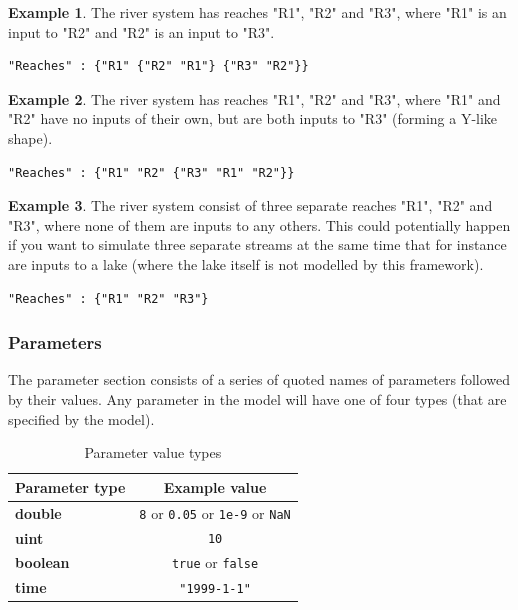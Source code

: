 \documentclass[11pt]{article}
\theoremstyle{definition}
\newtheorem{myexample}{Example}
\newenvironment{example}%
  {\begin{lrbox}{\examplebox}%
   \begin{minipage}{\dimexpr\linewidth-2\fboxsep}
   \begin{myexample}}%
  {\end{myexample}%
   \end{minipage}%
   \end{lrbox}%
   \begin{trivlist}
     \item[]\colorbox{silver}{\usebox\examplebox}
   \end{trivlist}}
\begin{document}
\begin{example}
The river system has reaches "R1", "R2" and "R3", where "R1" is an input to "R2" and "R2" is an input to "R3".
\begin{lstlisting}
"Reaches" : {"R1" {"R2" "R1"} {"R3" "R2"}}
\end{lstlisting} 
\end{example}

\begin{example}
The river system has reaches "R1", "R2" and "R3", where "R1" and "R2" have no inputs of their own, but are both inputs to "R3" (forming a Y-like shape).
\begin{lstlisting}
"Reaches" : {"R1" "R2" {"R3" "R1" "R2"}}
\end{lstlisting} 
\end{example}

\begin{example}
The river system consist of three separate reaches "R1", "R2" and "R3", where none of them are inputs to any others. This could potentially happen if you want to simulate three separate streams at the same time that for instance are inputs to a lake (where the lake itself is not modelled by this framework).
\begin{lstlisting}
"Reaches" : {"R1" "R2" "R3"}
\end{lstlisting} 
\end{example}

\subsubsection{Parameters}

The parameter section consists of a series of quoted names of parameters followed by their values. Any parameter in the model will have one of four types (that are specified by the model). 

\begin{table}[H]
\centering
\label{tab:parametervalues}
\begin{tabular}{|l|c|}
\hline
{\bf Parameter type} & {\bf Example value} \\
\hline
{\bf double} & {\tt 8} or {\tt 0.05} or {\tt 1e-9} or {\tt NaN}  \\
\hline
{\bf uint} & {\tt 10} \\
\hline
{\bf boolean} &{\tt  true} or {\tt false} \\
\hline
{\bf time} & {\tt "1999-1-1"} \\
\hline
\end{tabular}
\caption{Parameter value types}
\end{table}
\end{document}
